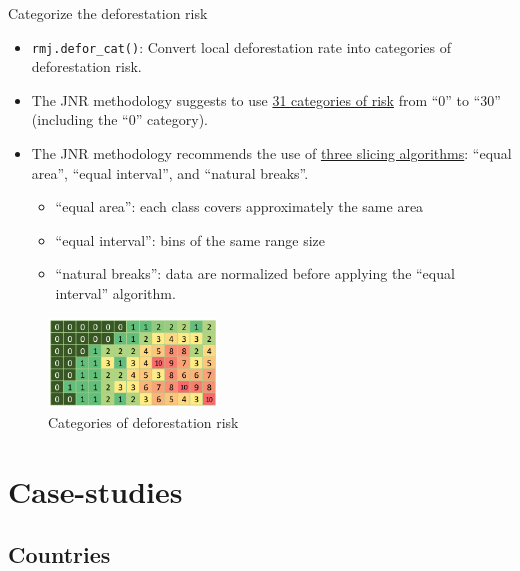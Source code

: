 \documentclass[10pt,table,dvipsnames,compress]{beamer}
\begin{document}
\begin{frame}[label={sec:orgeceef08},fragile]{Categorize the deforestation risk}
 \begin{itemize}
\item \texttt{rmj.defor\_cat()}: Convert local deforestation rate into categories of deforestation risk.
\item The JNR methodology suggests to use \uline{31 categories of risk} from ``0'' to ``30'' (including the ``0'' category).
\item The JNR methodology recommends the use of \uline{three slicing algorithms}: ``equal area'', ``equal interval'', and ``natural breaks''.
\begin{itemize}
\item ``equal area'': each class covers approximately the same area
\item ``equal interval'': bins of the same range size
\item ``natural breaks'': data are normalized before applying the ``equal interval'' algorithm.
\end{itemize}
\end{itemize}

\begin{figure}[htbp]
\centering
\includegraphics[width=0.4\textwidth]{figs/categories.png}
\caption{\label{fig:org719065e}Categories of deforestation risk}
\end{figure}  
\end{frame}

\section{Case-studies}
\label{sec:orgaf20642}

\subsection{Countries}
\label{sec:org68b9723}
\end{document}
